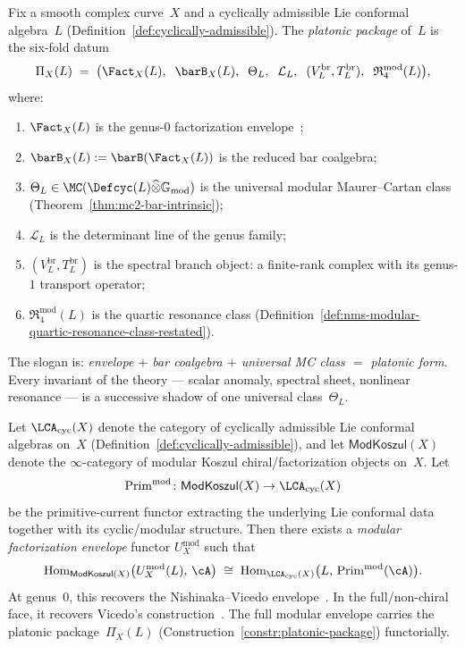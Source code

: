 \begin{construction}
\label{constr:platonic-package}
Fix a smooth complex curve~$X$ and a cyclically admissible Lie
conformal algebra~$L$
(Definition~\ref{def:cyclically-admissible}).
The \emph{platonic package} of~$L$ is the six-fold datum
\[
\Pi_X(L)
\;=\;
\bigl(
  \Fact_X(L),\;\;
  \barB_X(L),\;\;
  \Theta_L,\;\;
  \mathcal{L}_L,\;\;
  (V_L^{\mathrm{br}}, T_L^{\mathrm{br}}),\;\;
  \mathfrak{R}_4^{\mathrm{mod}}(L)
\bigr),
\]
where:
\begin{enumerate}[label=\textup{(\arabic*)}]
\item $\Fact_X(L)$ is the genus-$0$ factorization
  envelope~\cite{Nish26};
\item $\barB_X(L) := \barB(\Fact_X(L))$ is the reduced bar
  coalgebra;
\item $\Theta_L \in
  \MC(\Defcyc(L) \widehat\otimes \mathbb{G}_{\mathrm{mod}})$
  is the universal modular Maurer--Cartan class
  (Theorem~\ref{thm:mc2-bar-intrinsic});
\item $\mathcal{L}_L$ is the determinant line of the genus
  family;
\item $(V_L^{\mathrm{br}}, T_L^{\mathrm{br}})$ is the
  spectral branch object: a finite-rank complex with its
  genus-$1$ transport operator;
\item $\mathfrak{R}_4^{\mathrm{mod}}(L)$ is the quartic
  resonance class
  (Definition~\ref{def:nms-modular-quartic-resonance-class-restated}).
\end{enumerate}
The slogan is: \emph{envelope $+$ bar coalgebra $+$
universal MC class $=$ platonic form}.
Every invariant of the theory --- scalar anomaly, spectral
sheet, nonlinear resonance --- is a successive shadow of one
universal class~$\Theta_L$.
\end{construction}

\begin{conjecture}
\label{conj:platonic-adjunction}
\ClaimStatusConjectured
{}
Let $\LCA_{\mathrm{cyc}}(X)$ denote the category of
cyclically admissible Lie conformal algebras on~$X$
(Definition~\ref{def:cyclically-admissible}),
and let $\mathsf{ModKoszul}(X)$ denote the
$\infty$-category of modular Koszul chiral/factorization
objects on~$X$.
Let
\[
\operatorname{Prim}^{\mathrm{mod}} \colon
\mathsf{ModKoszul}(X) \to \LCA_{\mathrm{cyc}}(X)
\]
be the primitive-current functor extracting the underlying
Lie conformal data together with its cyclic/modular
structure.  Then there exists a \emph{modular factorization
envelope} functor $U_X^{\mathrm{mod}}$ such that
\[
\operatorname{Hom}_{\mathsf{ModKoszul}(X)}
  \bigl(U_X^{\mathrm{mod}}(L),\, \cA\bigr)
\;\cong\;
\operatorname{Hom}_{\LCA_{\mathrm{cyc}}(X)}
  \bigl(L,\, \operatorname{Prim}^{\mathrm{mod}}(\cA)\bigr).
\]
At genus~$0$, this recovers the Nishinaka--Vicedo
envelope~\cite{Nish26,Vic25}.  In the full/non-chiral
face, it recovers Vicedo's construction~\cite{Vic25}.
The full modular envelope carries the platonic
package~$\Pi_X(L)$
(Construction~\ref{constr:platonic-package})
functorially.
\end{conjecture}

